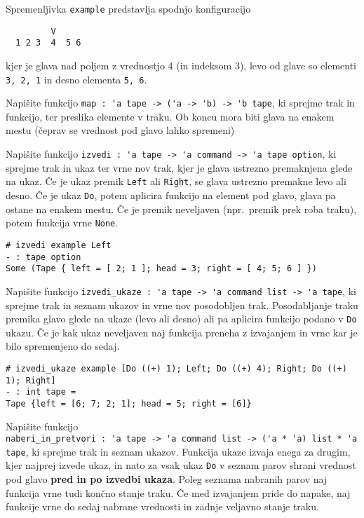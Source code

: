 \documentclass[arhiv]{../izpit}
\begin{document}
Spremenljivka \verb|example| predstavlja spodnjo konfiguracijo

\begin{verbatim}
         V
  1 2 3  4  5 6
\end{verbatim}

kjer je glava nad poljem z vrednostjo 4 (in indeksom 3), levo od glave so elementi \verb|3, 2, 1| in desno elementa \verb|5, 6|.


\podnaloga
Napišite funkcijo \verb|map : 'a tape -> ('a -> 'b) -> 'b tape|, ki sprejme trak in funkcijo, ter preslika elemente v traku. Ob koncu mora biti glava na enakem mestu (čeprav se vrednost pod glavo lahko spremeni)

\podnaloga
Napišite funkcijo \verb|izvedi : 'a tape -> 'a command -> 'a tape option|, ki sprejme trak in ukaz ter vrne nov trak, kjer je glava ustrezno premaknjena glede na ukaz.
Če je ukaz premik \verb|Left| ali \verb|Right|, se glava ustrezno premakne levo ali desno.
Če je ukaz \verb|Do|, potem aplicira funkcijo na element pod glavo, glava pa ostane na enakem mestu. Če je premik neveljaven (npr.~premik prek roba traku), potem funkcija vrne \verb|None|.

\begin{verbatim}
# izvedi example Left
- : tape option
Some (Tape { left = [ 2; 1 ]; head = 3; right = [ 4; 5; 6 ] })
\end{verbatim}

\podnaloga
Napišite funkcijo \verb|izvedi_ukaze : 'a tape -> 'a command list -> 'a tape|, ki sprejme trak in seznam ukazov in vrne nov posodobljen trak.
Posodabljanje traku premika glavo glede na ukaze (levo ali desno) ali pa aplicira funkcijo podano v \verb|Do| ukazu.
Če je kak ukaz neveljaven naj funkcija preneha z izvajanjem in vrne kar je bilo spremenjeno do sedaj.

\begin{verbatim}
# izvedi_ukaze example [Do ((+) 1); Left; Do ((+) 4); Right; Do ((+) 1); Right]
- : int tape =
Tape {left = [6; 7; 2; 1]; head = 5; right = [6]}
\end{verbatim}

\podnaloga
Napišite funkcijo \\\verb|naberi_in_pretvori : 'a tape -> 'a command list -> ('a * 'a) list * 'a tape|, ki sprejme trak in seznam ukazov. 
Funkcija ukaze izvaja enega za drugim, kjer najprej izvede ukaz, in nato za vsak ukaz \verb|Do| v seznam parov shrani vrednost pod glavo \textbf{pred in po izvedbi ukaza}.
Poleg seznama nabranih parov naj funkcija vrne tudi končno stanje traku.
Če med izvajanjem pride do napake, naj funkcije vrne do sedaj nabrane vrednosti in zadnje veljavno stanje traku. 
\end{document}

